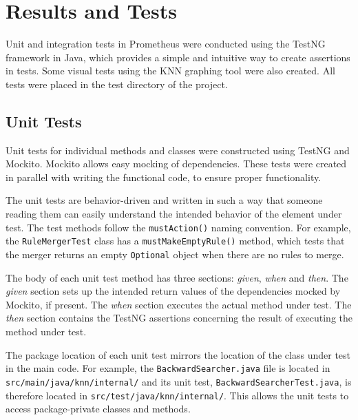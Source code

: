 \documentclass[titlepage,11pt]{article}
\newcommand{\code}[1]{\texttt{#1}}
\begin{document}
\section{Results and Tests} \label{sec:results}
Unit and integration tests in Prometheus were conducted using the TestNG framework in Java, which provides a simple and intuitive way to create assertions in tests. Some visual tests using the KNN graphing tool were also created. All tests were placed in the test directory of the project.

\subsection{Unit Tests}
Unit tests for individual methods and classes were constructed using TestNG and Mockito. Mockito allows easy mocking of dependencies. These tests were created in parallel with writing the functional code, to ensure proper functionality. 

The unit tests are behavior-driven and written in such a way that someone reading them can easily understand the intended behavior of the element under test. The test methods follow the \code{mustAction()} naming convention. For example, the \code{RuleMergerTest} class has a \code{mustMakeEmptyRule()} method, which tests that the merger returns an empty \code{Optional} object when there are no rules to merge.

The body of each unit test method has three sections: \emph{given}, \emph{when} and \emph{then}. The \emph{given} section sets up the intended return values of the dependencies mocked by Mockito, if present. The \emph{when} section executes the actual method under test. The \emph{then} section contains the TestNG assertions concerning the result of executing the method under test.

The package location of each unit test mirrors the location of the class under test in the main code. For example, the \code{BackwardSearcher.java} file is located in \code{src/main/java/knn/internal/} and its unit test, \code{BackwardSearcherTest.java}, is therefore located in \code{src/test/java/knn/internal/}. This allows the unit tests to access package-private classes and methods.
\end{document}
